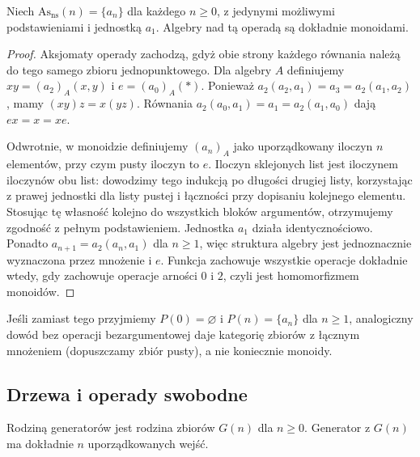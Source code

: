 \begin{przyklad}\label{cat:ex:ns-associative-operad}
Niech $\mathrm{As}_{\mathrm{ns}}(n)=\{a_n\}$ dla każdego $n\geq0$, z jedynymi możliwymi podstawieniami i jednostką $a_1$. Algebry nad tą operadą są dokładnie monoidami.
\end{przyklad}
\begin{proof}
Aksjomaty operady zachodzą, gdyż obie strony każdego równania należą do tego samego zbioru jednopunktowego. Dla algebry $A$ definiujemy $xy=(a_2)_A(x,y)$ i $e=(a_0)_A(*)$. Ponieważ $a_2(a_2,a_1)=a_3=a_2(a_1,a_2)$, mamy $(xy)z=x(yz)$. Równania $a_2(a_0,a_1)=a_1=a_2(a_1,a_0)$ dają $ex=x=xe$.

Odwrotnie, w monoidzie definiujemy $(a_n)_A$ jako uporządkowany iloczyn $n$ elementów, przy czym pusty iloczyn to $e$. Iloczyn sklejonych list jest iloczynem iloczynów obu list: dowodzimy tego indukcją po długości drugiej listy, korzystając z prawej jednostki dla listy pustej i łączności przy dopisaniu kolejnego elementu. Stosując tę własność kolejno do wszystkich bloków argumentów, otrzymujemy zgodność z pełnym podstawieniem. Jednostka $a_1$ działa identycznościowo. Ponadto $a_{n+1}=a_2(a_n,a_1)$ dla $n\geq1$, więc struktura algebry jest jednoznacznie wyznaczona przez mnożenie i $e$. Funkcja zachowuje wszystkie operacje dokładnie wtedy, gdy zachowuje operacje arności $0$ i $2$, czyli jest homomorfizmem monoidów.
\end{proof}

Jeśli zamiast tego przyjmiemy $P(0)=\varnothing$ i $P(n)=\{a_n\}$ dla $n\geq1$, analogiczny dowód bez operacji bezargumentowej daje kategorię zbiorów z łącznym mnożeniem (dopuszczamy zbiór pusty), a nie koniecznie monoidy.

\subsection{Drzewa i operady swobodne}

\begin{definicja}\label{cat:def:operad-graded-generators}
Rodziną generatorów jest rodzina zbiorów $G(n)$ dla $n\geq0$. Generator z $G(n)$ ma dokładnie $n$ uporządkowanych wejść.
\end{definicja}

